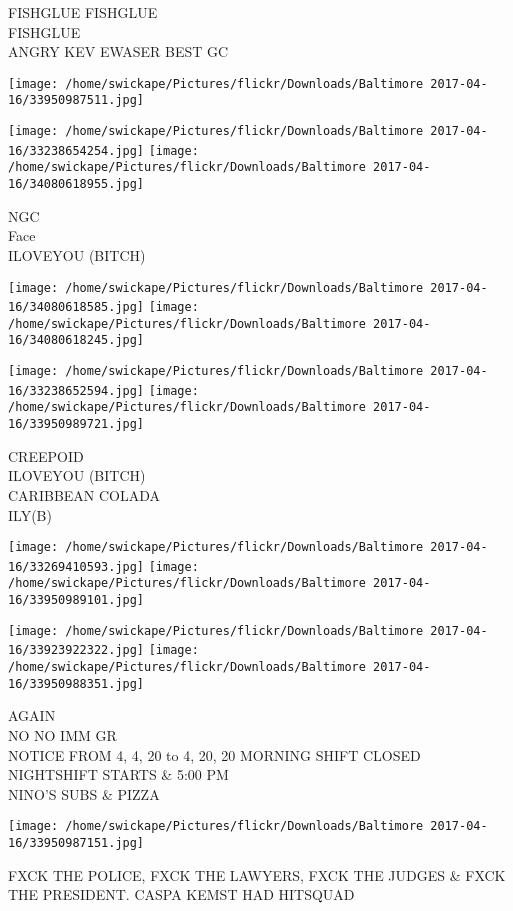 \documentclass[10pt,letterpaper]{article}
\begin{document}
FISHGLUE FISHGLUE\\
FISHGLUE\\
ANGRY KEV EWASER BEST GC
\pagebreak

\texttt{[image: /home/swickape/Pictures/flickr/Downloads/Baltimore 2017-04-16/33950987511.jpg]}

\vspace{0.25in}
\texttt{[image: /home/swickape/Pictures/flickr/Downloads/Baltimore 2017-04-16/33238654254.jpg]}
\texttt{[image: /home/swickape/Pictures/flickr/Downloads/Baltimore 2017-04-16/34080618955.jpg]}

NGC\\
Face\\
ILOVEYOU (BITCH)
\pagebreak

\texttt{[image: /home/swickape/Pictures/flickr/Downloads/Baltimore 2017-04-16/34080618585.jpg]}
\texttt{[image: /home/swickape/Pictures/flickr/Downloads/Baltimore 2017-04-16/34080618245.jpg]}

\texttt{[image: /home/swickape/Pictures/flickr/Downloads/Baltimore 2017-04-16/33238652594.jpg]}
\texttt{[image: /home/swickape/Pictures/flickr/Downloads/Baltimore 2017-04-16/33950989721.jpg]}

CREEPOID\\
ILOVEYOU (BITCH)\\
CARIBBEAN COLADA\\
ILY(B)
\pagebreak

\texttt{[image: /home/swickape/Pictures/flickr/Downloads/Baltimore 2017-04-16/33269410593.jpg]}
\texttt{[image: /home/swickape/Pictures/flickr/Downloads/Baltimore 2017-04-16/33950989101.jpg]}

\texttt{[image: /home/swickape/Pictures/flickr/Downloads/Baltimore 2017-04-16/33923922322.jpg]}
\texttt{[image: /home/swickape/Pictures/flickr/Downloads/Baltimore 2017-04-16/33950988351.jpg]}

AGAIN\\
NO NO IMM GR\\
NOTICE FROM 4, 4, 20 to 4, 20, 20 MORNING SHIFT CLOSED NIGHTSHIFT STARTS \& 5:00 PM\\
NINO'S SUBS \& PIZZA
\pagebreak

\texttt{[image: /home/swickape/Pictures/flickr/Downloads/Baltimore 2017-04-16/33950987151.jpg]}

FXCK THE POLICE, FXCK THE LAWYERS, FXCK THE JUDGES \& FXCK THE PRESIDENT.  CASPA KEMST HAD HITSQUAD
\pagebreak
\end{document}
